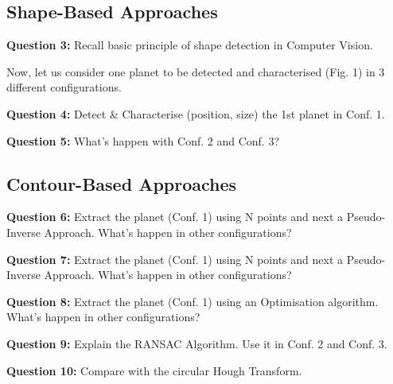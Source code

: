 \subsection{Shape-Based Approaches}

\textbf{Question 3:} Recall basic principle of shape detection in Computer Vision.

Now, let us consider one planet to be detected and characterised (Fig. 1) in 3 different configurations.

\textbf{Question 4:} Detect \& Characterise (position, size) the 1st planet in Conf. 1.

\textbf{Question 5:} What’s happen with Conf. 2 and Conf. 3?








\subsection{Contour-Based Approaches}

\textbf{Question 6:} Extract the planet (Conf. 1) using N points and next a Pseudo-Inverse Approach. What’s happen in other configurations?

\textbf{Question 7:} Extract the planet (Conf. 1) using N points and next a Pseudo-Inverse Approach. What’s happen in other configurations?

\textbf{Question 8:} Extract the planet (Conf. 1) using an Optimisation algorithm. What’s happen in other configurations?

\textbf{Question 9:} Explain the RANSAC Algorithm. Use it in Conf. 2 and Conf. 3.

\textbf{Question 10:} Compare with the circular Hough Transform.